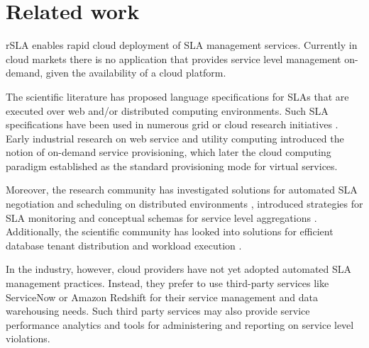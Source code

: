 \section{Related work}
rSLA enables rapid cloud deployment of SLA management services. Currently in cloud markets there is no application that provides service level management on-demand, given the availability of a cloud platform.

The scientific literature has proposed language specifications \cite{wsla, wsag} for SLAs that are executed over web and/or distributed computing environments. Such SLA specifications have been used in numerous grid or cloud research initiatives \cite{soi, butler, cslam}. Early industrial research on web service and utility computing \cite{ludwig, IBM1, dan} introduced the notion of on-demand service provisioning, which later the cloud computing paradigm established as the standard provisioning mode for virtual services.

Moreover, the research community has investigated solutions for automated SLA negotiation and scheduling on distributed environments \cite{SNAP, czaj, lessons}, introduced strategies for SLA monitoring \cite{rana} and conceptual schemas for service level aggregations \cite{ulhaq}.
Additionally, the scientific community has looked into solutions for efficient database tenant distribution and workload execution \cite{kraska, nec, sakr}. 

In the industry, however, cloud providers have not yet adopted automated SLA management practices. Instead, they prefer to use third-party services like ServiceNow \cite{servicenow} or Amazon Redshift \cite{redshift} for their service management and data warehousing needs. Such third party services may also provide service performance analytics and tools for administering and reporting on service level violations.
